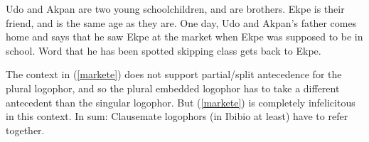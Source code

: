 \documentclass[output=paper]{langscibook}
\begin{document}
\begin{context}
	Udo and Akpan are two young schoolchildren, and are brothers. Ekpe is their friend, and is the same age as they are. One day, Udo and Akpan's father comes home and says that he saw Ekpe at the market when Ekpe was supposed to be in school. Word that he has been spotted skipping class gets back to Ekpe.
	\end{context}
	\begin{exe}	
		\label{markete}	
\end{exe}
The context in (\ref{markete}) does not support partial/split antecedence for the plural logophor, and so the plural embedded logophor has to take a different antecedent than the singular logophor. But (\ref{markete}) is completely infelicitous in this context. In sum: Clausemate logophors (in Ibibio at least) have to refer together.
\end{document}
